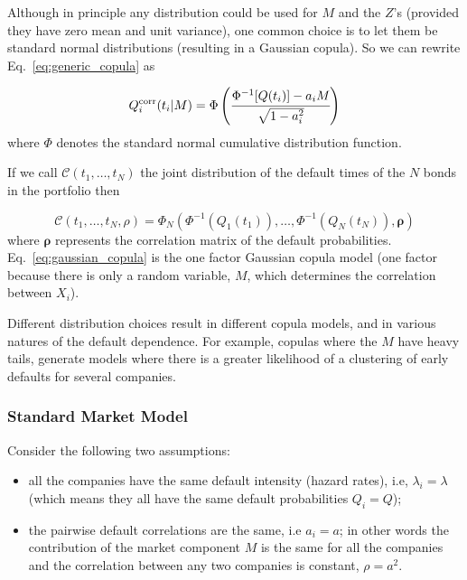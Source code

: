 Although in principle any distribution could be used for \(M\) and the \(Z\)'s (provided they have zero mean and unit variance), one common choice is to let them be standard normal distributions (resulting in a Gaussian copula).
So we can rewrite Eq.~\ref{eq:generic_copula} as

\begin{equation}
Q_i^{\textrm{corr}}(t_i|M) = \Phi\left(\cfrac{\Phi^{-1}[Q(t_i)]-a_i M}{\sqrt{1-a_i^2}}\right)
\label{eq:gaussian_one_factor_copula}
\end{equation}
where $\Phi$ denotes the standard normal cumulative distribution function.

If we call $\mathcal{C}(t_1,\ldots,t_N)$ the joint distribution of the default times of the $N$ bonds in the portfolio then

\begin{equation}
\mathcal{C}(t_1,\ldots,t_N, \rho)=\Phi_{N}(\Phi^{-1}(Q_1(t_1)),\ldots,\Phi^{-1}(Q_N(t_N)), \boldsymbol{\rho})
\label{eq:gaussian_copula}
\end{equation}
where $\boldsymbol{\rho}$ represents the correlation matrix of the default probabilities. Eq.~\ref{eq:gaussian_copula} is the one factor Gaussian copula model (one factor because there is only a random variable, $M$, which determines the correlation between $X_i$).

Different distribution choices result in different copula models, and in various natures of the default dependence. For example, copulas where the \(M\) have heavy tails, generate models where there is a greater likelihood of a clustering of early defaults for several companies.

\subsubsection{Standard Market Model}
\label{standard-market-model}

Consider the following two assumptions:

\begin{itemize}
\tightlist
\item all the companies have the same default intensity (hazard rates), i.e, \(\lambda_i = \lambda\) (which means they all have the same default probabilities $Q_i = Q$);
\item the pairwise default correlations are the same, i.e \(a_i = a\); in other words the contribution of the market component $M$ is the same for all the companies and the correlation between any two companies is constant, \(\rho = a^2\).
\end{itemize}

